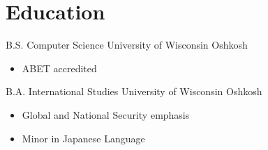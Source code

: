\documentclass[12pt,letterpaper,sans]{moderncv}
\begin{document}
\makecvtitle
\section{Education}
    {B.S. Computer Science} 
    {University of Wisconsin Oshkosh} 
    {}
    {}
    {\begin{itemize}
        \item ABET accredited
    \end{itemize}}
    {B.A. International Studies} 
    {University of Wisconsin Oshkosh}
    {}
    {} 
    {\begin{itemize}
        \item Global and National Security emphasis
        \item Minor in Japanese Language
    \end{itemize}}
\end{document}
